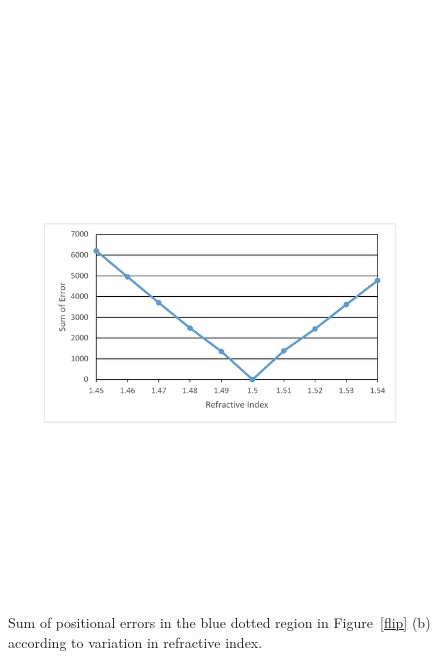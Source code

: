 \documentclass[10pt,twocolumn,letterpaper]{article}
\begin{document}
\begin{figure}
  \centering
	\includegraphics[width=1\linewidth]{figure/Ref_graph3.pdf}	
  \caption{Sum of positional errors in the blue dotted region in Figure~\ref{flip} (b) according to variation in refractive index.}
  \label{graph}
\end{figure}
\end{document}
